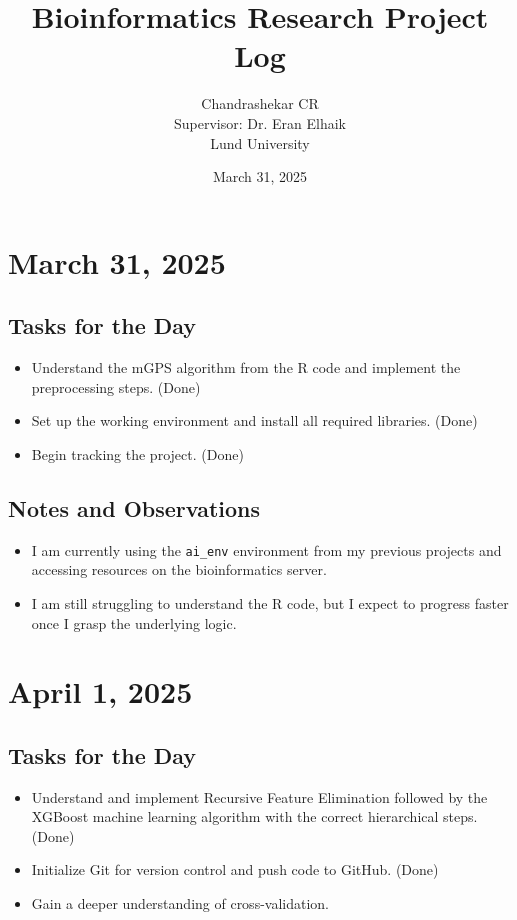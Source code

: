 \documentclass{article}
\title{\textbf{Bioinformatics Research Project Log}}
\author{Chandrashekar CR \\ Supervisor: Dr. Eran Elhaik \\ Lund University}
\date{March 31, 2025}
\begin{document}
\maketitle
\tableofcontents
\newpage

\section{March 31, 2025}

\subsection*{Tasks for the Day}
\begin{itemize}
    \item Understand the mGPS algorithm from the R code and implement the preprocessing steps. (Done)
    \item Set up the working environment and install all required libraries. (Done)
    \item Begin tracking the project. (Done)
\end{itemize}

\subsection*{Notes and Observations}
\begin{itemize}
    \item I am currently using the \texttt{ai\_env} environment from my previous projects and accessing resources on the bioinformatics server.
    \item I am still struggling to understand the R code, but I expect to progress faster once I grasp the underlying logic.
\end{itemize}

\section{April 1, 2025}

\subsection*{Tasks for the Day}
\begin{itemize}
    \item Understand and implement Recursive Feature Elimination followed by the XGBoost machine learning algorithm with the correct hierarchical steps. (Done)
    \item Initialize Git for version control and push code to GitHub. (Done)
    \item Gain a deeper understanding of cross-validation.
\end{itemize}
\end{document}

